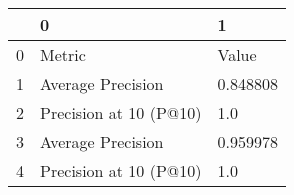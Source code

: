 \begin{tabular}{lll}
\toprule
{} &                       0 &         1 \\
\midrule
0 &                  Metric &     Value \\
1 &       Average Precision &  0.848808 \\
2 &  Precision at 10 (P@10) &       1.0 \\
3 &       Average Precision &  0.959978 \\
4 &  Precision at 10 (P@10) &       1.0 \\
\bottomrule
\end{tabular}
